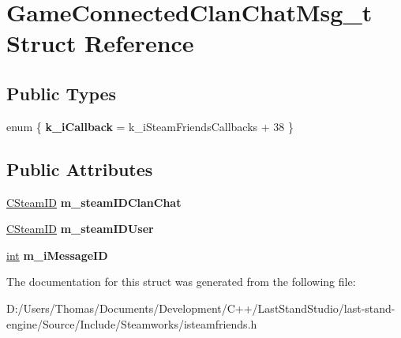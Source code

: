 \hypertarget{structGameConnectedClanChatMsg__t}{}\section{Game\+Connected\+Clan\+Chat\+Msg\+\_\+t Struct Reference}
\label{structGameConnectedClanChatMsg__t}
\subsection*{Public Types}
\begin{DoxyCompactItemize}
\item 
\hypertarget{structGameConnectedClanChatMsg__t_a28b3a231d661dced3792d5cd8ad6fa0d}{}enum \{ {\bfseries k\+\_\+i\+Callback} = k\+\_\+i\+Steam\+Friends\+Callbacks + 38
 \}\label{structGameConnectedClanChatMsg__t_a28b3a231d661dced3792d5cd8ad6fa0d}

\end{DoxyCompactItemize}
\subsection*{Public Attributes}
\begin{DoxyCompactItemize}
\item 
\hypertarget{structGameConnectedClanChatMsg__t_a541dfce1dbab9e98bcadb4aa1bae6388}{}\hyperlink{classCSteamID}{C\+Steam\+I\+D} {\bfseries m\+\_\+steam\+I\+D\+Clan\+Chat}\label{structGameConnectedClanChatMsg__t_a541dfce1dbab9e98bcadb4aa1bae6388}

\item 
\hypertarget{structGameConnectedClanChatMsg__t_a9c435bfbf38c17693079add735c1dd82}{}\hyperlink{classCSteamID}{C\+Steam\+I\+D} {\bfseries m\+\_\+steam\+I\+D\+User}\label{structGameConnectedClanChatMsg__t_a9c435bfbf38c17693079add735c1dd82}

\item 
\hypertarget{structGameConnectedClanChatMsg__t_a4b5c3326e5a9b9eb196ff11fc896a709}{}\hyperlink{SDL__thread_8h_a6a64f9be4433e4de6e2f2f548cf3c08e}{int} {\bfseries m\+\_\+i\+Message\+I\+D}\label{structGameConnectedClanChatMsg__t_a4b5c3326e5a9b9eb196ff11fc896a709}

\end{DoxyCompactItemize}


The documentation for this struct was generated from the following file\+:\begin{DoxyCompactItemize}
\item 
D\+:/\+Users/\+Thomas/\+Documents/\+Development/\+C++/\+Last\+Stand\+Studio/last-\/stand-\/engine/\+Source/\+Include/\+Steamworks/isteamfriends.\+h\end{DoxyCompactItemize}
